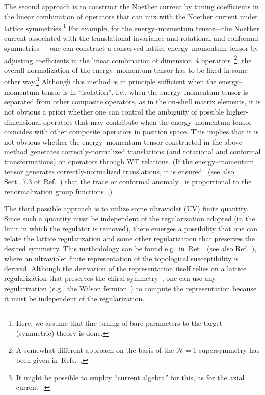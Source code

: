 The second approach is to construct the Noether current by tuning coefficients
in the linear combination of operators that can mix with the Noether current
under lattice symmetries.\footnote{Here, we assume that fine tuning of
bare parameters to the target (symmetric) theory is done.} For example, for the
energy--momentum tensor---the Noether current associated with the translational
invariance and rotational and conformal
symmetries~\cite{Callan:1970ze,Coleman:1970je}---one can construct a conserved
lattice energy--momentum tensor by adjusting coefficients in the linear
combination of dimension~$4$
operators~\cite{Caracciolo:1988hc,Caracciolo:1989pt}\footnote{A somewhat
different approach on the basis of the $\mathcal{N}=1$ supersymmetry has been
given in~Refs.~\cite{Suzuki:2013gi,Suzuki:2012wx}.}; the overall normalization
of the energy--momentum tensor has to be fixed in some other way.\footnote{It
might be possible to employ ``current algebra'' for this, as for the axial
current~\cite{Bochicchio:1985xa}.} Although this method is in principle
sufficient when the energy--momentum tensor is in ``isolation'', i.e., when the
energy--momentum tensor is separated from other composite operators, as in the
on-shell matrix elements, it is not obvious a priori whether one can control
the ambiguity of possible higher-dimensional operators that may contribute when
the energy--momentum tensor coincides with other composite operators in
position space. This implies that it is not obvious whether the
energy--momentum tensor constructed in the above method generates
correctly-normalized translations (and rotational and conformal
transformations) on operators through WT relations. (If the energy--momentum
tensor generates correctly-normalized translations, it is
ensured~\cite{Fujikawa:1980rc} (see also Sect.~7.3
of~Ref.~\cite{Fujikawa:2004cx}) that the trace or conformal
anomaly~\cite{Crewther:1972kn,Chanowitz:1972vd} is proportional to the
renormalization group
functions~\cite{Adler:1976zt,Nielsen:1977sy,Collins:1976yq}.)

The third possible approach is to utilize some ultraviolet (UV) finite
quantity. Since such a quantity must be independent of the regularization
adopted (in the limit in which the regulator is removed), there emerges a
possibility that one can relate the lattice regularization and some other
regularization that preserves the desired symmetry. This methodology can be
found e.g.\ in~Ref.~\cite{Luscher:2004fu} (see also
Ref.~\cite{Luscher:2010ik}), where an ultraviolet finite representation of the
topological susceptibility is derived. Although the derivation of the
representation itself relies on a lattice regularization that preserves the
chiral symmetry~\cite{Kaplan:1992bt,Neuberger:1997fp,Hasenfratz:1997ft,%
Hasenfratz:1998ri,Neuberger:1998wv,Hasenfratz:1998jp,Luscher:1998pqa,%
Niedermayer:1998bi}, one can use any regularization (e.g., the Wilson
fermion~\cite{Wilson:1975hf}) to compute the representation because it must be
independent of the regularization.

